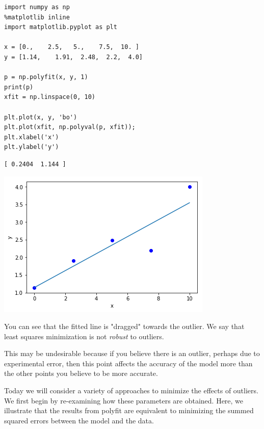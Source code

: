 \documentclass[11pt]{article}
\begin{document}
\begin{verbatim}
import numpy as np
%matplotlib inline
import matplotlib.pyplot as plt

x = [0.,    2.5,   5.,    7.5,  10. ]
y = [1.14,    1.91,  2.48,  2.2,  4.0]

p = np.polyfit(x, y, 1)
print(p)
xfit = np.linspace(0, 10)

plt.plot(x, y, 'bo')
plt.plot(xfit, np.polyval(p, xfit));
plt.xlabel('x')
plt.ylabel('y')
\end{verbatim}

\begin{verbatim}
[ 0.2404  1.144 ]

\end{verbatim}




\begin{center}
\includegraphics[width=.9\linewidth]{obipy-resources/37c51028cef42d76546d882661b04271-4039131w.png}
\end{center}

You can see that the fitted line is "dragged" towards the outlier. We say that least squares minimization is not \emph{robust} to outliers.

This may be undesirable because if you believe there is an outlier, perhaps due to experimental error, then this point affects the accuracy of the model more than the other points you believe to be more accurate.

Today we will consider a variety of approaches to minimize the effects of outliers. We first begin by re-examining how these parameters are obtained. Here, we illustrate that the results from polyfit are equivalent to minimizing the summed squared errors between the model and the data.
\end{document}

